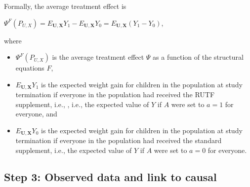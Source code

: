 \documentclass{article}\usepackage[]{graphicx}\usepackage[]{xcolor}
\begin{document}
\begin{enumerate}[label=\textbf{\alph*.}]
    Formally, the average treatment effect is
    
    $\Psi^F(P_{U,X}) = E_{\bm{U},\bm{X}}Y_1 - E_{\bm{U},\bm{X}}Y_0 = E_{\bm{U},\bm{X}}(Y_1 - Y_0)$,
    
where

    \begin{itemize}

      \item $\Psi^F(P_{U,X})$ is the average treatment effect $\Psi$ as a function of the structural equations $F$,
      \item $E_{\bm{U},\bm{X}}Y_1$ is the expected weight gain for children in the population at study termination if everyone in the population had received the RUTF supplement, i.e., , i.e., the expected value of $Y$ if $A$ were set to $a = 1$ for everyone, and
      \item $E_{\bm{U},\bm{X}}Y_0$ is the expected weight gain for children in the population at study termination if everyone in the population had received the standard supplement, i.e., the expected value of $Y$ if $A$ were set to $a = 0$ for everyone.

    \end{itemize}

  \end{enumerate}
  
  \subsection{Step 3: Observed data and link to causal}
  
\end{document}

